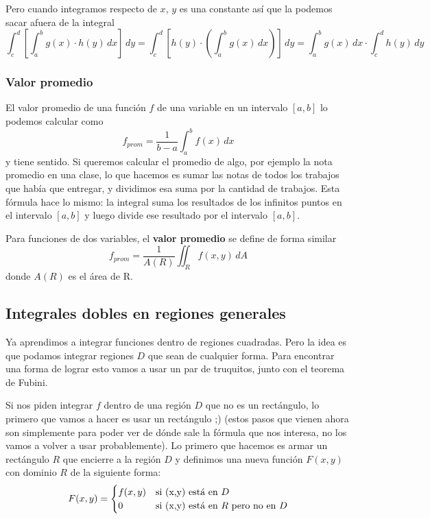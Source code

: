 \documentclass[12pt]{article}
\begin{document}
Pero cuando integramos respecto de $ x $, $ y $ es una constante así que la podemos sacar afuera de la integral
\[
  \int_{c}^{d} \left[\int_{a}^{b} g(x)\cdot h(y) \,dx\right] \,dy = \int_{c}^{d} \left[h(y)\cdot \left(\int_{a}^{b} g(x) \,dx\right)\right] \,dy = \int_{a}^{b} g(x) \,dx\cdot \int_{c}^{d} h(y) \,dy
\]

\subsubsection{Valor promedio}
El valor promedio de una función $ f $ de una variable en un intervalo $ \left[a,b\right] $ lo podemos calcular como
\[
  f_{prom}=\frac{1}{b-a}\int_{a}^{b} f(x) \,dx
\]
y tiene sentido. Si queremos calcular el promedio de algo, por ejemplo la nota promedio en una clase, lo que hacemos es sumar las notas de todos los trabajos que había que entregar, y dividimos esa suma por la cantidad de trabajos. Esta fórmula hace lo mismo: la integral suma los resultados de los infinitos puntos en el intervalo $ \left[a,b\right] $ y luego divide ese resultado por el intervalo $ \left[a,b\right] $.

Para funciones de dos variables, el \textbf{valor promedio} se define de forma similar
\[
  f_{prom}=\frac{1}{A(R)}\iint_{R} f(x,y) \,dA
\]
donde $ A(R) $ es el área de R.

\subsection{Integrales dobles en regiones generales}
Ya aprendimos a integrar funciones dentro de regiones cuadradas. Pero la idea es que podamos integrar regiones $ D $ que sean de cualquier forma. Para encontrar una forma de lograr esto vamos a usar un par de truquitos, junto con el teorema de Fubini. 

Si nos piden integrar $ f $ dentro de una región $ D $ que no es un rectángulo, lo primero que vamos a hacer es usar un rectángulo ;) (estos pasos que vienen ahora son simplemente para poder ver de dónde sale la fórmula que nos interesa, no los vamos a volver a usar probablemente). Lo primero que hacemos es armar un rectángulo $ R $ que encierre a la región $ D $ y definimos una nueva función $ F(x,y) $ con dominio $ R $ de la siguiente forma:
\[
  F(x,y)=
  \begin{cases}
  f(x,y) & \text{si (x,y) está en $ D $}\\
  0 & \text{si (x,y) está en $ R $ pero no en $ D $}
  \end{cases}
\]
\end{document}
